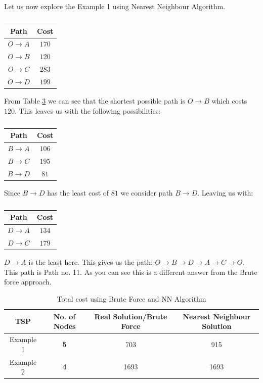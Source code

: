 \documentclass[a4paper]{article}
\begin{document}
Let us now explore the Example 1 using Nearest Neighbour Algorithm.
\begin{table}[H]
    \centering
    \begin{tabular}{|c|c|}
    \hline
    Path & Cost\\ 
    \hline
    $O\to A$ & $170$  \\
    $O\to B$ & $120$  \\
    $O\to C$ & $283$  \\
    $O\to D$ & $199$  \\
    \end{tabular}
    \caption{}
    \label{tab:path1Suchir}
\end{table}
From Table \ref{tab:path1Suchir} we can see that the shortest possible path is $O\to B$ which costs $120$. This leaves us with the following possibilities:
\begin{table}[H]
    \centering
    \begin{tabular}{|c|c|}
    \hline
    Path & Cost\\ 
    \hline
    $B\to A$ & $106$  \\
    $B\to C$ & $195$  \\
    $B\to D$ & $81$  \\
    \end{tabular}
    \caption{}
    \label{tab:path1Suchir}
\end{table}
Since $B\to D$ has the least cost of $81$ we consider path $B\to D$. Leaving us with:
\begin{table}[H]
    \centering
    \begin{tabular}{|c|c|}
    \hline
    Path & Cost\\ 
    \hline
    $D\to A$ & $134$  \\
    $D\to C$ & $179$  \\
    \end{tabular}
    \caption{}
    \label{tab:path1Suchir}
\end{table}
$D\to A$ is the least here. This gives us the path: $O\to B \to D \to A \to C \to O$. This path is Path no. 11. As you can see this is a different answer from the Brute force approach.
\begin{table}[h]
    \centering
    \begin{tabular}{|c|c|cc|}
    \hline
    TSP & No. of Nodes & Real Solution/Brute Force & Nearest Neighbour Solution \\ \hline
    Example 1      & \textbf{5}   & 703  & 915\\
    Example 2      & \textbf{4}   & 1693 & 1693\\
    \end{tabular}
    \caption{Total cost using Brute Force and NN Algorithm}
    \label{tab:eg1CostMatrix}
\end{table}
\end{document}
